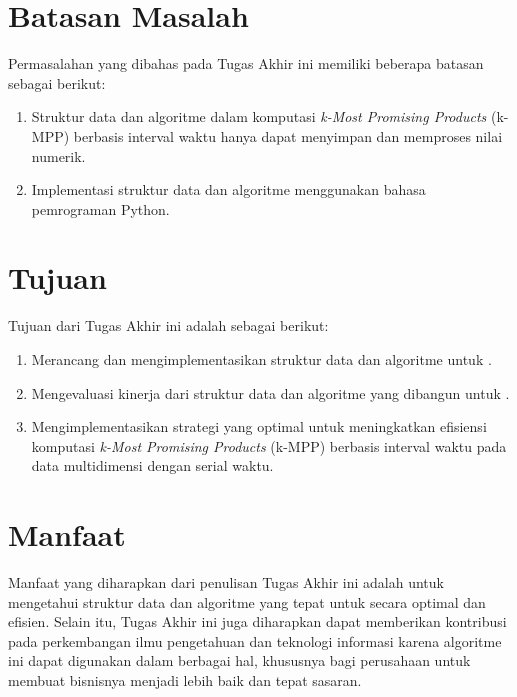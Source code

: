\section{Batasan Masalah}
\tab Permasalahan yang dibahas pada Tugas Akhir ini memiliki beberapa batasan sebagai berikut:
\begin{enumerate}
	\item Struktur data dan algoritme dalam komputasi \textit{k-Most Promising Products} (k-MPP) berbasis interval waktu hanya dapat menyimpan dan memproses nilai numerik.
	\item Implementasi struktur data dan algoritme menggunakan bahasa pemrograman Python.
\end{enumerate}

\section{Tujuan}
\tab Tujuan dari Tugas Akhir ini adalah sebagai berikut:

\begin{enumerate}
	\item Merancang dan mengimplementasikan struktur data dan algoritme untuk \problemm.
	\item Mengevaluasi kinerja dari struktur data dan algoritme yang dibangun untuk \problemm.
	\pagebreak
	\item Mengimplementasikan strategi yang optimal untuk meningkatkan efisiensi komputasi \textit{k-Most Promising Products} (k-MPP) berbasis interval waktu pada data multidimensi dengan serial waktu.
\end{enumerate}

\section{Manfaat}
\tab Manfaat yang diharapkan dari penulisan Tugas Akhir ini adalah untuk mengetahui struktur data dan algoritme yang tepat untuk \problemm secara optimal dan efisien. Selain itu, Tugas Akhir ini juga diharapkan dapat memberikan kontribusi pada perkembangan ilmu pengetahuan dan teknologi informasi karena algoritme ini dapat digunakan dalam berbagai hal, khususnya bagi perusahaan untuk membuat bisnisnya menjadi lebih baik dan tepat sasaran.

